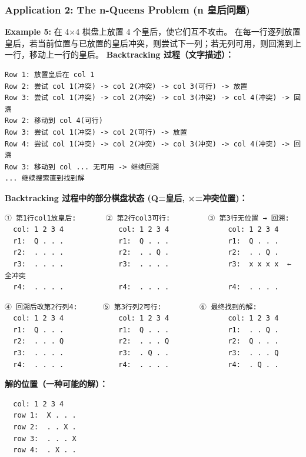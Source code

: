 \documentclass[10pt,a4paper,openany]{ctexbook}
\theoremstyle{definition}
\theoremstyle{remark}
\begin{document}
\subsubsection{Application 2: The n-Queens Problem (n 皇后问题)}

\textbf{Example 5:} 在 4×4 棋盘上放置 4 个皇后，使它们互不攻击。
在每一行逐列放置皇后，若当前位置与已放置的皇后冲突，则尝试下一列；若无列可用，则回溯到上一行，移动上一行的皇后。
\textbf{Backtracking 过程（文字描述）：}
{\footnotesize\begin{verbatim}
Row 1: 放置皇后在 col 1
Row 2: 尝试 col 1(冲突) -> col 2(冲突) -> col 3(可行) -> 放置
Row 3: 尝试 col 1(冲突) -> col 2(冲突) -> col 3(冲突) -> col 4(冲突) -> 回溯
Row 2: 移动到 col 4(可行)
Row 3: 尝试 col 1(冲突) -> col 2(可行) -> 放置
Row 4: 尝试 col 1(冲突) -> col 2(冲突) -> col 3(冲突) -> col 4(冲突) -> 回溯
Row 3: 移动到 col ... 无可用 -> 继续回溯
... 继续搜索直到找到解
\end{verbatim}}

\textbf{Backtracking 过程中的部分棋盘状态 (Q=皇后, ×=冲突位置)：}
{\footnotesize\begin{verbatim}
① 第1行col1放皇后:       ② 第2行col3可行:         ③ 第3行无位置 → 回溯:
  col: 1 2 3 4             col: 1 2 3 4              col: 1 2 3 4
  r1:  Q . . .             r1:  Q . . .              r1:  Q . . .
  r2:  . . . .             r2:  . . Q .              r2:  . . Q .
  r3:  . . . .             r3:  . . . .              r3:  x x x x  ← 全冲突
  r4:  . . . .             r4:  . . . .              r4:  . . . .
\end{verbatim}}

{\footnotesize\begin{verbatim}
④ 回溯后改第2行列4:      ⑤ 第3行列2可行:         ⑥ 最终找到的解:
  col: 1 2 3 4             col: 1 2 3 4              col: 1 2 3 4
  r1:  Q . . .             r1:  Q . . .              r1:  . . Q .
  r2:  . . . Q             r2:  . . . Q              r2:  Q . . .
  r3:  . . . .             r3:  . Q . .              r3:  . . . Q
  r4:  . . . .             r4:  . . . .              r4:  . Q . .
\end{verbatim}}

\textbf{解的位置（一种可能的解）：}
{\footnotesize\begin{verbatim}
  col: 1 2 3 4
  row 1:  X . . .
  row 2:  . . X .
  row 3:  . . . X
  row 4:  . X . .
\end{verbatim}}

\vspace{-2pt}
\end{document}
